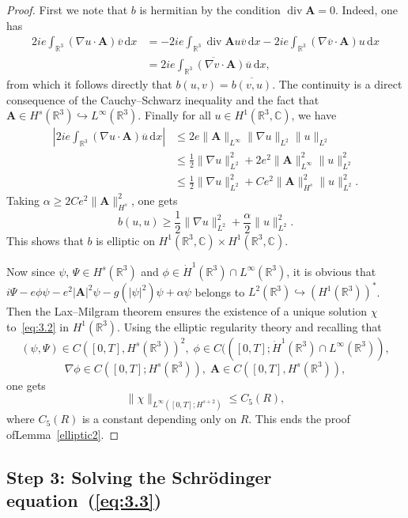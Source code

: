\documentclass[AHL,Unicode,longabstracts]{cedram}
\newcommand{\BA}{\mathbf{A}}
\newcommand{\R}{\mathbb{R}}
\newcommand{\Com}{\mathbb{C}}
\DeclareMathOperator{\Div}{div}
\newcommand*{\dd}{\mathrm{d}}
\newcommand*{\dx}{\dd x}
\begin{document}
\begin{proof}
First we note that $b$ is hermitian by the condition $\Div \BA=0$. Indeed, one has
\begin{align*}
2ie \int_{\R^3} (\nabla u\cdot \BA) \overline{v} \,\dx &= -2ie \int_{\R^3} \Div \BA u\overline{v} \,\dx -2ie \int_{\R^3} (\nabla \overline{v} \cdot \BA) u \,\dx \\
&= \overline{2ie \int_{\R^3}(\nabla {v}\cdot \BA)\overline{u} \,\dx},
\end{align*}
from which it follows directly that $b(u,v)=\overline{b(v,u)}$. The continuity is a direct consequence of the Cauchy--Schwarz inequality and the fact that $\BA\in H^s(\R^3) \hookrightarrow L^\infty(\R^3)$. Finally for all $u\in H^1(\R^3,\Com)$, we have
\begin{align*}
\left | 2ie\int_{\R^3} (\nabla u\cdot \BA) \overline{u} \,\dx\right| &\leq 2e \| \BA \|_{L^\infty} \| \nabla u \|_{L^2} \| u \|_{L^2} \\
&\leq \frac{1}{2} \| \nabla u \|_{L^2}^2 +2e^2 \| \BA \|_{L^\infty}^2 \| u \|_{L^2}^2\\
&\leq \frac{1}{2} \| \nabla u \|_{L^2}^2 +Ce^2 \| \BA \|_{H^s}^2 \| u \|_{L^2}^2.
\end{align*}
Taking $\alpha \ge 2Ce^2 \| \BA \|_{H^s}^2$, one gets
\[
b(u,u) \geq \frac{1}{2} \| \nabla u \|_{L^2}^2 + \frac{\alpha}{2} \| u \|_{L^2}^2.
\]
This shows that $b$ is elliptic on $H^1(\R^3,\Com)\times H^1(\R^3,\Com)$.

Now since $\psi$, $\Psi\in H^s(\R^3)$ and $\phi\in \dot{H}^1(\R^3)\cap L^\infty(\R^3)$, it is obvious that $ i\Psi-e\phi \psi -e^2 |\BA|^2 \psi -g(|\psi|^2)\psi+\alpha \psi$ belongs to $L^2(\R^3)\hookrightarrow (H^1(\R^3))^*$. Then the Lax--Milgram theorem ensures the existence of a unique solution $\chi$ to~\eqref{eq:3.2} in $H^1(\R^3)$. Using the elliptic regularity theory and recalling that
\[
(\psi,\Psi) \in C([0,T],H^s(\R^3))^2,
\; \phi \in C(([0,T];\dot{H}^1(\R^3)\cap L^\infty(\R^3)),
\]
\[
\nabla \phi \in C([0,T];H^s(\R^3)),\; \BA \in C([0,T],H^s(\R^3)),
\]
one gets
\[
\| \chi \|_{L^\infty([0,T];H^{s+2})}\leq C_5(R),
\]
where $C_5(R)$ is a constant depending only on $R$. This ends the proof of\linebreak Lemma~\ref{elliptic2}.
\end{proof}

\subsection*{Step 3: Solving the Schr\"odinger equation~(\ref{eq:3.3})}
\end{document}
